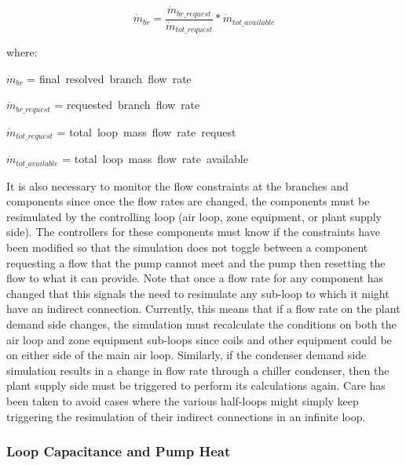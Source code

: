 \begin{equation}
{\dot m_{br}} = \frac{{{{\dot m}_{br\_request}}}}{{{{\dot m}_{tot\_request}}}}*{\dot m_{tot\_available}}
\end{equation}

where:

\( \dot m_{br} \) = \textrm{ final~resolved~branch~flow~rate}

\( \dot m_{br\_request} \) = \textrm{ requested~branch~flow~rate }

\( \dot m_{tot\_request} \) = \textrm{ total~loop~mass~flow~rate~request}

\( \dot m_{tot\_available} \) = \textrm{ total~loop~mass~flow~rate~available}

It is also necessary to monitor the flow constraints at the branches and components since once the flow rates are changed, the components must be resimulated by the controlling loop (air loop, zone equipment, or plant supply side). The controllers for these components must know if the constraints have been modified so that the simulation does not toggle between a component requesting a flow that the pump cannot meet and the pump then resetting the flow to what it can provide. Note that once a flow rate for any component has changed that this signals the need to resimulate any sub-loop to which it might have an indirect connection. Currently, this means that if a flow rate on the plant demand side changes, the simulation must recalculate the conditions on both the air loop and zone equipment sub-loops since coils and other equipment could be on either side of the main air loop. Similarly, if the condenser demand side simulation results in a change in flow rate through a chiller condenser, then the plant supply side must be triggered to perform its calculations again. Care has been taken to avoid cases where the various half-loops might simply keep triggering the resimulation of their indirect connections in an infinite loop.

\subsubsection{Loop Capacitance and Pump Heat}\label{loop-capacitance-and-pump-heat}

